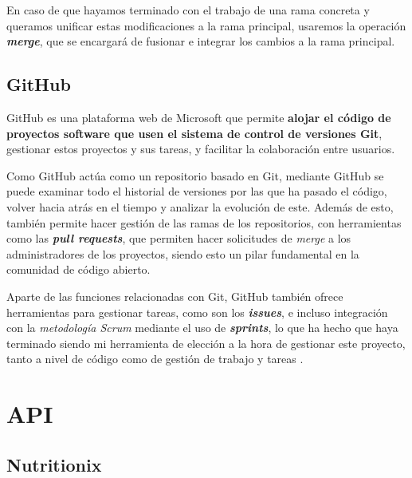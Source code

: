 En caso de que hayamos terminado con el trabajo de una rama concreta y queramos unificar estas modificaciones a la rama principal, usaremos la operación \textit{\textbf{merge}}, que se encargará de fusionar e integrar los cambios a la rama principal. \cite{git:git-basics}


\subsection{GitHub}

GitHub es una plataforma web de Microsoft que permite \textbf{alojar el código de proyectos software que usen el sistema de control de versiones Git}, gestionar estos proyectos y sus tareas, y facilitar la colaboración entre usuarios.


Como GitHub actúa como un repositorio basado en Git, mediante GitHub se puede examinar todo el historial de versiones por las que ha pasado el código, volver hacia atrás en el tiempo y analizar la evolución de este. Además de esto, también permite hacer gestión de las ramas de los repositorios, con herramientas como las \textit{\textbf{pull requests}}, que permiten hacer solicitudes de \textit{merge} a los administradores de los proyectos, siendo esto un pilar fundamental en la comunidad de código abierto.

Aparte de las funciones relacionadas con Git, GitHub también ofrece herramientas para gestionar tareas, como son los \textit{\textbf{issues}}, e incluso integración con la \textit{metodología Scrum} mediante el uso de \textit{\textbf{sprints}}, lo que ha hecho que haya terminado siendo mi herramienta de elección a la hora de gestionar este proyecto, tanto a nivel de código como de gestión de trabajo y tareas \cite{wikipedia:github}.



\section{API}


\subsection{Nutritionix}


